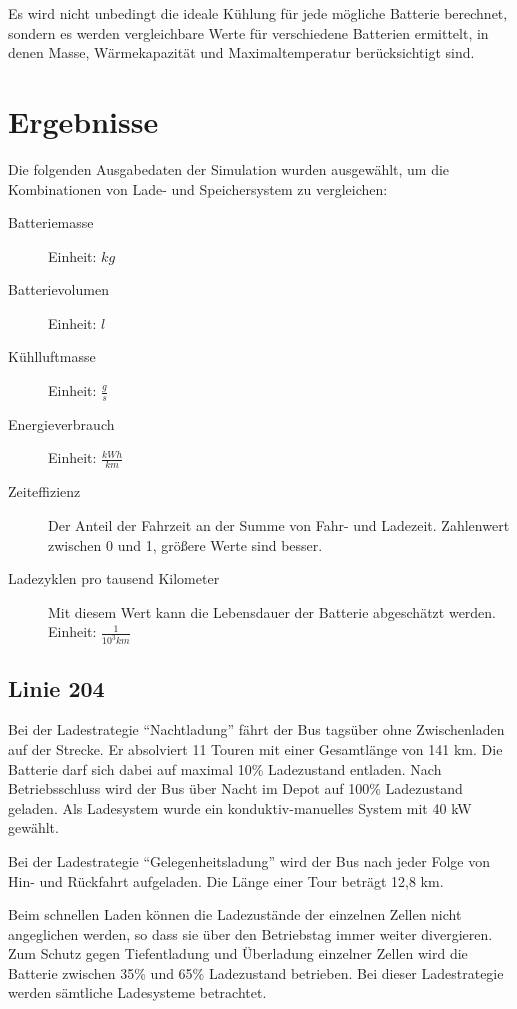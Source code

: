 Es wird nicht unbedingt die ideale Kühlung für jede mögliche Batterie berechnet, sondern es werden vergleichbare Werte für verschiedene Batterien ermittelt, in denen Masse, Wärmekapazität und Maximaltemperatur berücksichtigt sind.

\section{Ergebnisse}
\label{simErgebnisse}
Die folgenden Ausgabedaten der Simulation wurden ausgewählt, um die Kombinationen von Lade- und Speichersystem zu vergleichen:
\begin{description}
	\item[Batteriemasse] Einheit: $kg$
	\item[Batterievolumen] Einheit: $l$
	\item[Kühlluftmasse] Einheit: $\frac{g}{s}$
	\item[Energieverbrauch] Einheit: $\frac{kWh}{km}$
	\item[Zeiteffizienz] Der Anteil der Fahrzeit an der Summe von Fahr- und Ladezeit. Zahlenwert zwischen 0 und 1, größere Werte sind besser.
	\item[Ladezyklen pro tausend Kilometer] Mit diesem Wert kann die Lebensdauer der Batterie abgeschätzt werden.\\
	Einheit: $\frac{1}{10^{3}km}$  
\end{description}

\subsection{Linie 204}
\label{erkl204} 
Bei der Ladestrategie "`Nachtladung"' fährt der Bus tagsüber ohne Zwischenladen auf der Strecke. Er absolviert 11 Touren mit einer Gesamtlänge von 141 km. Die Batterie darf sich dabei auf maximal 10\% Ladezustand entladen. Nach Betriebsschluss wird der Bus über Nacht im Depot auf 100\% Ladezustand geladen. Als Ladesystem wurde ein konduktiv-manuelles System mit 40 kW gewählt.

Bei der Ladestrategie "`Gelegenheitsladung"' wird der Bus nach jeder Folge von Hin- und Rückfahrt aufgeladen. Die Länge einer Tour beträgt 12,8 km. 

Beim schnellen Laden können die Ladezustände der einzelnen Zellen nicht angeglichen werden, so dass sie über den Betriebstag immer weiter divergieren. Zum Schutz gegen Tiefentladung und Überladung einzelner Zellen wird die Batterie zwischen 35\% und 65\% Ladezustand betrieben. Bei dieser Ladestrategie werden sämtliche Ladesysteme betrachtet.

